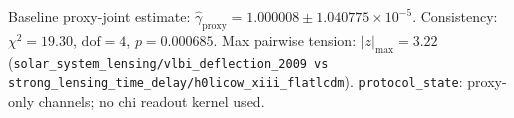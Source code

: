 Baseline proxy-joint estimate: $\widehat\gamma_{\mathrm{proxy}}=1.000008 \pm 1.040775\times 10^{-5}$. Consistency: $\chi^2=19.30$, $\mathrm{dof}=4$, $p=0.000685$. Max pairwise tension: $|z|_{\max}=3.22$ (\texttt{solar\_system\_lensing/vlbi\_deflection\_2009 vs strong\_lensing\_time\_delay/h0licow\_xiii\_flatlcdm}). \texttt{protocol\_state}: proxy-only channels; no chi readout kernel used.
